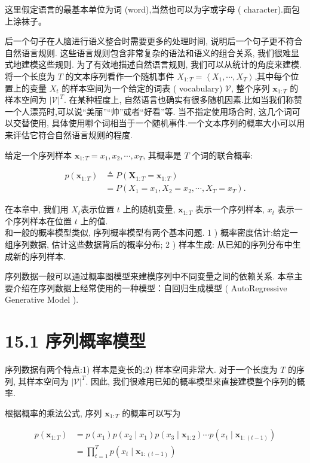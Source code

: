 \documentclass[10pt]{article}
\begin{document}
这里假定语言的最基本单位为词 (word),当然也可以为字或字母 ( character).面包上涂袜子。

后一个句子在人脑进行语义整合时需要更多的处理时间, 说明后一个句子更不符合自然语言规则. 这些语言规则包含非常复杂的语法和语义的组合关系, 我们很难显式地建模这些规则. 为了有效地描述自然语言规则, 我们可以从统计的角度来建模. 将一个长度为 $T$ 的文本序列看作一个随机事件 $X_{1: T}=\left\langle X_{1}, \cdots, X_{T}\right\rangle$,其中每个位置上的变量 $X_{t}$ 的样本空间为一个给定的词表 ( vocabulary) $\mathcal{V}$, 整个序列 $\boldsymbol{x}_{1: T}$ 的样本空间为 $|\mathcal{V}|^{T}$. 在某种程度上, 自然语言也确实有很多随机因素.比如当我们称赞一个人漂亮时,可以说“美丽”“帅”或者“好看”等. 当不指定使用场合时, 这几个词可以交替使用, 具体使用哪个词相当于一个随机事件.一个文本序列的概率大小可以用来评估它符合自然语言规则的程度.

给定一个序列样本 $\boldsymbol{x}_{1: T}=x_{1}, x_{2}, \cdots, x_{T}$, 其概率是 $T$ 个词的联合概率:


\begin{align*}
p\left(\boldsymbol{x}_{1: T}\right) & \triangleq P\left(\boldsymbol{X}_{1: T}=\boldsymbol{x}_{1: T}\right)  \tag{15.1}\\
& =P\left(X_{1}=x_{1}, X_{2}=x_{2}, \cdots, X_{T}=x_{T}\right) . \tag{15.2}
\end{align*}


在本章中, 我们用 $X_{t}$表示位置 $t$ 上的随机变量, $\boldsymbol{x}_{1: T}$ 表示一个序列样本, $x_{t}$ 表示一个序列样本在位置 $t$ 上的值.\\
和一般的概率模型类似, 序列概率模型有两个基本问题. 1 ) 概率密度估计:给定一组序列数据, 估计这些数据背后的概率分布; 2 ) 样本生成: 从已知的序列分布中生成新的序列样本.

序列数据一般可以通过概率图模型来建模序列中不同变量之间的依赖关系. 本章主要介绍在序列数据上经常使用的一种模型：自回归生成模型 ( AutoRegressive Generative Model ).

\section*{15.1 序列概率模型}
序列数据有两个特点:1) 样本是变长的;2) 样本空间非常大. 对于一个长度为 $T$ 的序列, 其样本空间为 $|\mathcal{V}|^{T}$. 因此, 我们很难用已知的概率模型来直接建模整个序列的概率.

根据概率的乘法公式, 序列 $\boldsymbol{x}_{1: T}$ 的概率可以写为


\begin{align*}
p\left(\boldsymbol{x}_{1: T}\right) & =p\left(x_{1}\right) p\left(x_{2} \mid x_{1}\right) p\left(x_{3} \mid \boldsymbol{x}_{1: 2}\right) \cdots p\left(x_{t} \mid \boldsymbol{x}_{1:(t-1)}\right)  \tag{15.3}\\
& =\prod_{t=1}^{T} p\left(x_{t} \mid \boldsymbol{x}_{1:(t-1)}\right) \tag{15.4}
\end{align*}
\end{document}
